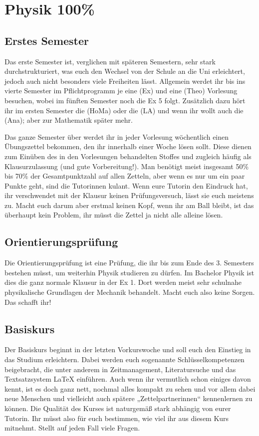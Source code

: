 \section{Physik 100\%}

\subsection{Erstes Semester}
Das erste Semester ist, verglichen mit späteren Semestern, sehr stark durchstrukturiert, was euch den Wechsel von der Schule an die Uni erleichtert, jedoch auch nicht besonders viele Freiheiten lässt.  Allgemein werdet ihr bis ins vierte Semester im Pflichtprogramm je eine  (\gls{Ex}) und eine  (\gls{Theo}) Vorlesung besuchen, wobei im fünften Semester noch die \gls{Ex} 5 folgt. Zusätzlich dazu hört ihr im ersten Semester die  (\gls{HoMa}) oder die  (\gls{LA}) und wenn ihr wollt auch die  (\gls{Ana}); aber zur Mathematik später mehr.

Das ganze Semester über werdet ihr in jeder Vorlesung wöchentlich einen Übungszettel bekommen, den ihr innerhalb einer Woche lösen sollt. Diese dienen zum Einüben des in den Vorlesungen behandelten Stoffes und zugleich häufig als Klausurzulassung (und gute Vorbereitung!). Man benötigt meist insgesamt 50\% bis 70\% der Gesamtpunktzahl auf allen Zetteln, aber wenn es nur um ein paar Punkte geht, sind die Tutorinnen kulant. Wenn eure Tutorin den Eindruck hat, ihr verschwendet mit der Klausur keinen Prüfungsversuch, lässt sie euch meistens zu. Macht euch darum aber erstmal keinen Kopf, wenn ihr am Ball bleibt, ist das überhaupt kein Problem, ihr müsst die Zettel ja nicht alle alleine lösen.

\subsection{Orientierungsprüfung}
Die Orientierungsprüfung ist eine Prüfung, die ihr bis zum Ende des 3. Semesters bestehen müsst, um weiterhin Physik studieren zu dürfen. Im Bachelor Physik ist dies die ganz normale Klausur in der \gls{Ex} 1. Dort werden meist sehr schulnahe physikalische Grundlagen der Mechanik behandelt. Macht euch also keine Sorgen. Das schafft ihr!

\subsection{Basiskurs}
Der Basiskurs beginnt in der letzten Vorkurswoche und soll euch den Einstieg in das Studium erleichtern. Dabei werden euch sogenannte Schlüsselkompetenzen beigebracht, die unter anderem in Zeitmanagement, Literatursuche und das Textsatzsystem \LaTeX{} einführen. Auch wenn ihr vermutlich schon einiges davon kennt, ist es doch ganz nett, nochmal alles kompakt zu sehen und vor allem dabei neue Menschen und vielleicht auch spätere „Zettelpartnerinnen“ kennenlernen zu können. Die Qualität des Kurses ist naturgemäß stark abhängig von eurer Tutorin. Ihr müsst also für euch bestimmen, wie viel ihr aus diesem Kurs mitnehmt. Stellt auf jeden Fall viele Fragen.

